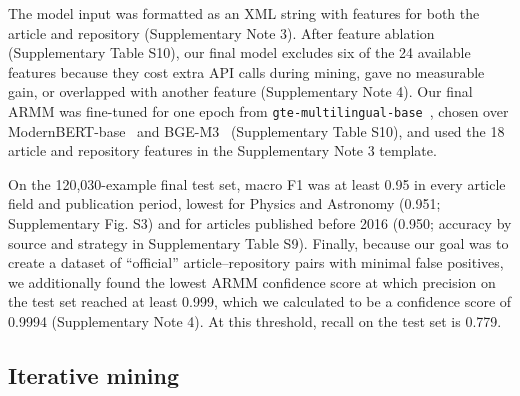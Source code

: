 \documentclass[pdflatex,sn-nature]{sn-jnl}%
\begin{document}
The model input was formatted as an XML string with features for both the article and repository (Supplementary Note 3).
After feature ablation (Supplementary Table S10), our final model excludes six of the 24 available features because they cost extra API calls during mining, gave no measurable gain, or overlapped with another feature (Supplementary Note 4).
Our final ARMM was fine-tuned for one epoch from \texttt{gte-multilingual-base}~\cite{zhang2024mgte}, chosen over ModernBERT-base~\cite{warner2025smarter} and BGE-M3~\cite{chen2024m3} (Supplementary Table S10), and used the 18 article and repository features in the Supplementary Note 3 template.

On the 120,030-example final test set, macro F1 was at least 0.95 in every article field and publication period, lowest for Physics and Astronomy (0.951; Supplementary Fig. S3) and for articles published before 2016 (0.950; accuracy by source and strategy in Supplementary Table S9).
Finally, because our goal was to create a dataset of ``official'' article--repository pairs with minimal false positives, we additionally found the lowest ARMM confidence score at which precision on the test set reached at least 0.999, which we calculated to be a confidence score of 0.9994 (Supplementary Note 4).
At this threshold, recall on the test set is 0.779.

\subsection{Iterative mining}\label{subsec:m-mining}
\end{document}
